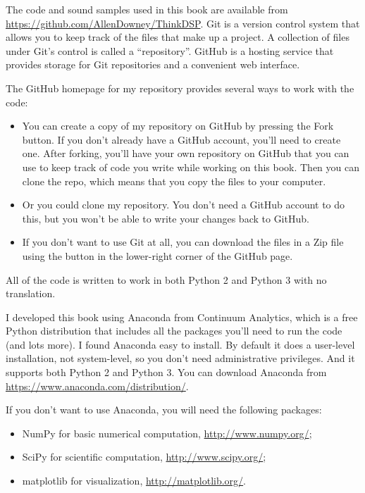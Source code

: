 \documentclass[12pt]{book}
\begin{document}
The code and sound samples used in this book are available from
\url{https://github.com/AllenDowney/ThinkDSP}.  Git is a version
control system that allows you to keep track of the files that
make up a project.  A collection of files under Git's control is
called a ``repository''.  GitHub is a hosting service that provides
storage for Git repositories and a convenient web interface.

The GitHub homepage for my repository provides several ways to
work with the code:

\begin{itemize}

\item You can create a copy of my repository
on GitHub by pressing the {\sf Fork} button.  If you don't already
have a GitHub account, you'll need to create one.  After forking, you'll
have your own repository on GitHub that you can use to keep track
of code you write while working on this book.  Then you can
clone the repo, which means that you copy the files
to your computer.

\item Or you could clone
my repository.  You don't need a GitHub account to do this, but you
won't be able to write your changes back to GitHub.

\item If you don't want to use Git at all, you can download the files
in a Zip file using the button in the lower-right corner of the
GitHub page.

\end{itemize}

All of the code is written to work in both Python 2 and Python 3
with no translation.

I developed this book using Anaconda from
Continuum Analytics, which is a free Python distribution that includes
all the packages you'll need to run the code (and lots more).
I found Anaconda easy to install.  By default it does a user-level
installation, not system-level, so you don't need administrative
privileges.  And it supports both Python 2 and Python 3.  You can
download Anaconda from \url{https://www.anaconda.com/distribution/}.

If you don't want to use Anaconda, you will need the following
packages:

\begin{itemize}

\item NumPy for basic numerical computation, \url{http://www.numpy.org/};

\item SciPy for scientific computation,
  \url{http://www.scipy.org/};

\item matplotlib for visualization, \url{http://matplotlib.org/}.

\end{itemize}
\end{document}
